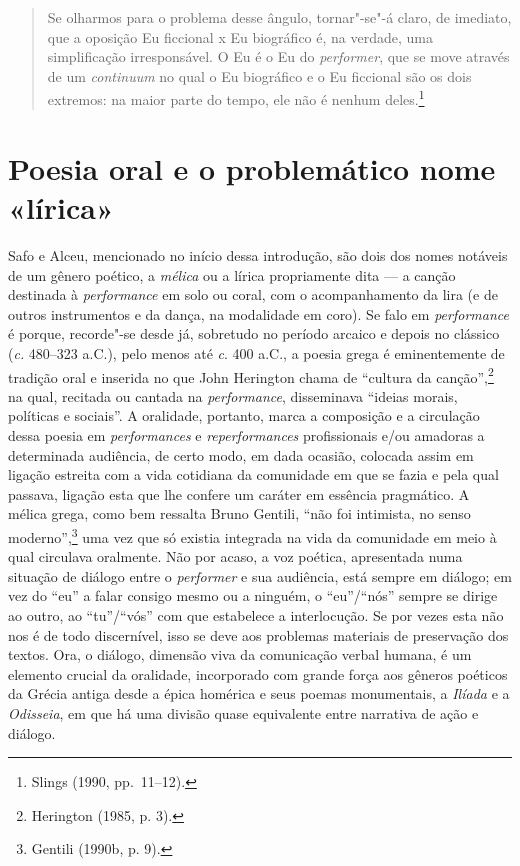 \begin{quote}
Se olharmos para o problema desse ângulo, tornar"-se"-á claro, de imediato, que
a oposição Eu ficcional x Eu biográfico é, na verdade, uma simplificação
irresponsável. O Eu é o Eu do \textit{performer}, que se move através de um
\textit{continuum} no qual o Eu biográfico e o Eu ficcional são os dois
extremos: na maior parte do tempo, ele não é nenhum deles.\footnote{ Slings (1990, pp.~11--12).}
\end{quote}


\section{Poesia oral e o problemático nome «lírica»}

Safo e Alceu, mencionado no início dessa introdução, são dois dos nomes notáveis de um gênero poético, a
\textit{mélica} ou a lírica propriamente dita --- a canção destinada à
\textit{performance} em solo ou coral,
com o acompanhamento da lira (e de outros instrumentos e da dança, na
modalidade em coro). Se falo em \textit{performance} é porque, recorde"-se
desde já, sobretudo no período arcaico e depois no clássico (\textit{c.}
480--323 a.C.), pelo menos até \textit{c}. 400 a.C., a poesia grega é eminentemente de tradição oral e inserida no
que John Herington chama de “cultura da canção”,\footnote{ Herington (1985, p. 3).} na
qual, recitada ou cantada na \textit{performance}, disseminava
“ideias morais, políticas e sociais”. A oralidade, portanto, marca
a composição e a circulação dessa poesia em \textit{performances} e
\textit{reperformances} profissionais e/ou amadoras a determinada
audiência, de certo modo, em dada ocasião, colocada assim em ligação estreita
com a vida cotidiana da comunidade em que se fazia e pela qual passava, ligação
esta que lhe confere um caráter em essência pragmático. A mélica grega,
como bem ressalta Bruno Gentili, “não foi intimista, no senso
moderno”,\footnote{ Gentili (1990b, p. 9).} uma vez que só existia integrada na
vida da comunidade em meio à qual
circulava oralmente. Não por acaso, a voz poética, apresentada numa
situação de diálogo entre o \textit{performer} e sua audiência, está sempre em
diálogo; em vez do “eu” a falar consigo mesmo ou a ninguém, o “eu”/“nós” sempre
se dirige ao outro, ao “tu”/“vós” com que estabelece a interlocução. Se por
vezes esta não nos é de todo discernível, isso se deve aos problemas
materiais de preservação dos textos. Ora, o diálogo, dimensão viva da
comunicação verbal humana, é um elemento crucial da oralidade, incorporado com
grande força aos gêneros poéticos da Grécia antiga desde a épica homérica e
seus poemas monumentais, a \textit{Ilíada} e a \textit{Odisseia}, em que há uma
divisão quase equivalente entre narrativa de ação e diálogo. 

